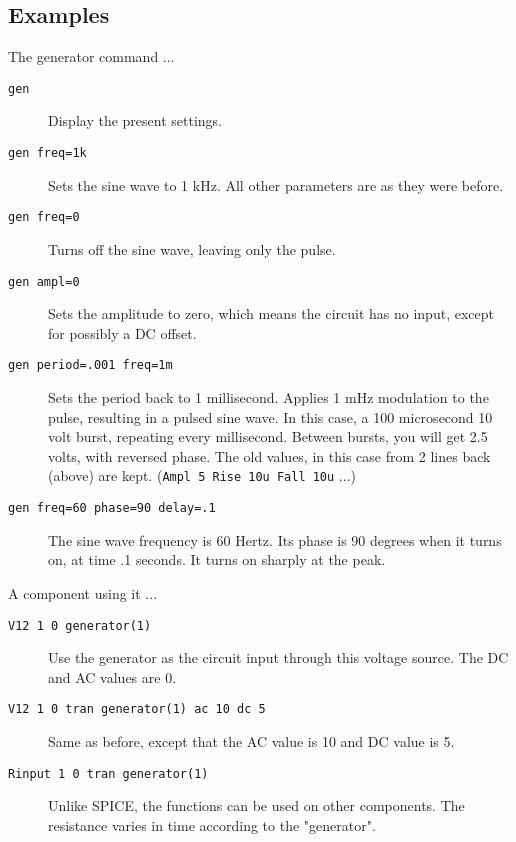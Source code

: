 \subsection{Examples}

The generator command ...

\begin{description}

\item[{\tt gen}] Display the present settings.

\item[{\tt gen freq=1k}] Sets the sine wave to 1 kHz.  All other parameters
are as they were before.

\item[{\tt gen freq=0}] Turns off the sine wave, leaving only the pulse.

\item[{\tt gen ampl=0}] Sets the amplitude to zero, which means the circuit
has no input, except for possibly a DC offset.

\item[{\tt gen period=.001 freq=1m}] Sets the period back to 1 millisecond.
Applies 1 mHz modulation to the pulse, resulting in a pulsed sine wave.  In
this case, a 100 microsecond 10 volt burst, repeating every millisecond.
Between bursts, you will get 2.5 volts, with reversed phase.  The old
values, in this case from 2 lines back (above) are kept.  ({\tt Ampl 5 Rise
10u Fall 10u} ...)

\item[{\tt gen freq=60 phase=90 delay=.1}] The sine wave frequency is 60
Hertz.  Its phase is 90 degrees when it turns on, at time .1 seconds.  It
turns on sharply at the peak.

\end{description}

A component using it ...

\begin{description}

\item[{\tt V12 1 0 generator(1)}] Use the generator as the circuit
input through this voltage source.  The DC and AC values are 0.

\item[{\tt V12 1 0 tran generator(1) ac 10 dc 5}] Same as before, except
that the AC value is 10 and DC value is 5.

\item[{\tt Rinput 1 0 tran generator(1)}] Unlike SPICE, the functions
can be used on other components.  The resistance varies in time
according to the "generator".

\end{description}

